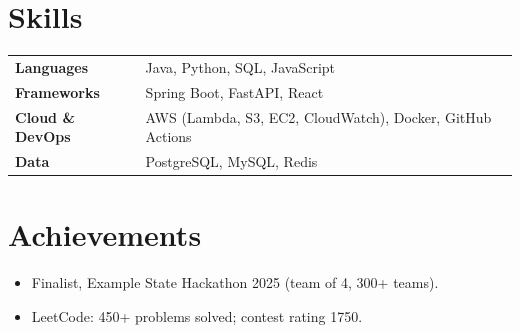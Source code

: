 \documentclass[10.5pt,a4paper]{article}
\begin{document}
\section{Skills}
\begin{tabularx}{\linewidth}{@{}l X@{}}
  \textbf{Languages} & Java, Python, SQL, JavaScript \\
  \textbf{Frameworks} & Spring Boot, FastAPI, React \\
  \textbf{Cloud \& DevOps} & AWS (Lambda, S3, EC2, CloudWatch), Docker, GitHub Actions \\
  \textbf{Data} & PostgreSQL, MySQL, Redis \\
\end{tabularx}

\section{Achievements}
\begin{itemize}
  \item Finalist, Example State Hackathon 2025 (team of 4, 300+ teams).
  \item LeetCode: 450+ problems solved; contest rating 1750.
\end{itemize}
\end{document}
